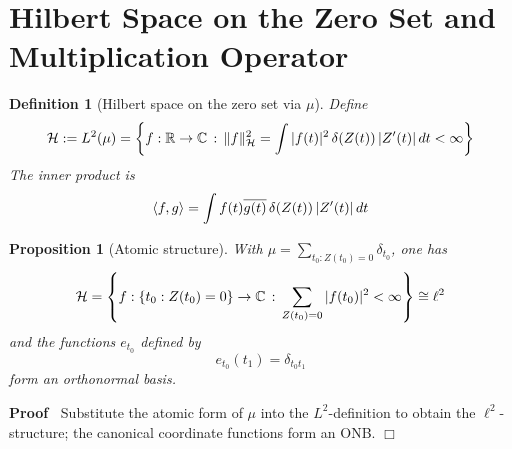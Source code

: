 \documentclass{article}
\newcommand{\assign}{:=}
\newenvironment{proof}{\noindent\textbf{Proof\ }}{\hspace*{\fill}$\Box$\medskip}
\newtheorem{definition}{Definition}
\newtheorem{proposition}{Proposition}
{\theorembodyfont{\rmfamily}\newtheorem{remark}{Remark}}
\begin{document}
\section{Hilbert Space on the Zero Set and Multiplication Operator}

\begin{definition}
  [Hilbert space on the zero set via $\mu$] Define
  \begin{equation}
    \mathcal{H} \assign L^2 (\mu) = \left\{ f : \mathbb{R} \to \mathbb{C}
    \hspace{0.17em} : \hspace{0.17em} \|f\|_{\mathcal{H}}^2 = \int |f (t) |^2 
    \hspace{0.17em} \delta (Z (t)) \hspace{0.17em} |Z' (t) | \hspace{0.17em}
    dt < \infty \right\}
  \end{equation}
  The inner product is
  \begin{equation}
    \langle f, g \rangle = \int f (t) \overline{g (t)} \hspace{0.17em} \delta
    (Z (t)) \hspace{0.17em} |Z' (t) |  \hspace{0.17em} dt
  \end{equation}
\end{definition}

\begin{proposition}
  [Atomic structure] With $\mu = \sum_{t_0 : Z (t_0) = 0} \delta_{t_0}$, one
  has
  \begin{equation}
    \mathcal{H}= \left\{ f : \{t_0 : Z (t_0) = 0\} \to \mathbb{C}
    \hspace{0.17em} : \hspace{0.17em} \sum_{Z (t_0) = 0} |f (t_0) |^2 < \infty
    \right\} \cong \ell^2
  \end{equation}
  and the functions $e_{t_0}$ defined by
  \begin{equation}
    e_{t_0} (t_1) = \delta_{t_0 t_1}
  \end{equation}
  form an orthonormal basis.
\end{proposition}

\begin{proof}
  Substitute the atomic form of $\mu$ into the $L^2$-definition to obtain the
  $\ell^2$-structure; the canonical coordinate functions form an ONB.
\end{proof}
\end{document}
